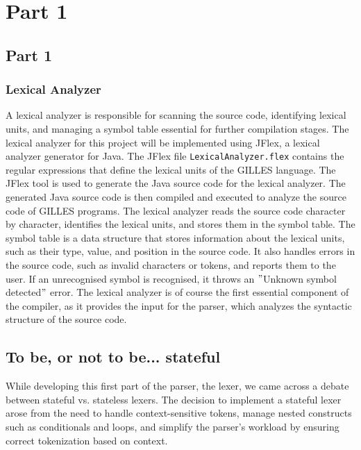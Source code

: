 \setcounter{secnumdepth}{3}

\chapter{Part 1}

    \section{Part 1}
    \subsection{Lexical Analyzer}
	A lexical analyzer is responsible for scanning the source code, identifying lexical units,
	and managing a symbol table essential for further compilation stages.
	The lexical analyzer for this project will be implemented using JFlex, a lexical analyzer generator for Java.
	The JFlex file \texttt{LexicalAnalyzer.flex} contains the regular expressions that define the lexical units of the GILLES language.
	The JFlex tool is used to generate the Java source code for the lexical analyzer.
	The generated Java source code is then compiled and executed to analyze the source code of GILLES programs.
	The lexical analyzer reads the source code character by character, identifies the lexical units, and stores them in the symbol table.
	The symbol table is a data structure that stores information about the lexical units, such as their type, value, and position in the source code.
	It also handles errors in the source code, such as invalid characters or tokens, and reports them to the user. If an unrecognised symbol is recognised, it throws an \("\)Unknown symbol detected\("\) error.
	The lexical analyzer is of course the first essential component of the compiler, as it provides the input for the parser, which analyzes the syntactic structure of the source code.\\

 \section{To be, or not to be... stateful}

While developing this first part of the parser, the lexer, we came across a debate between stateful vs. stateless lexers. The decision to implement a stateful lexer arose from the need to handle context-sensitive tokens, manage nested constructs such as conditionals and loops, and simplify the parser's workload by ensuring correct tokenization based on context.

